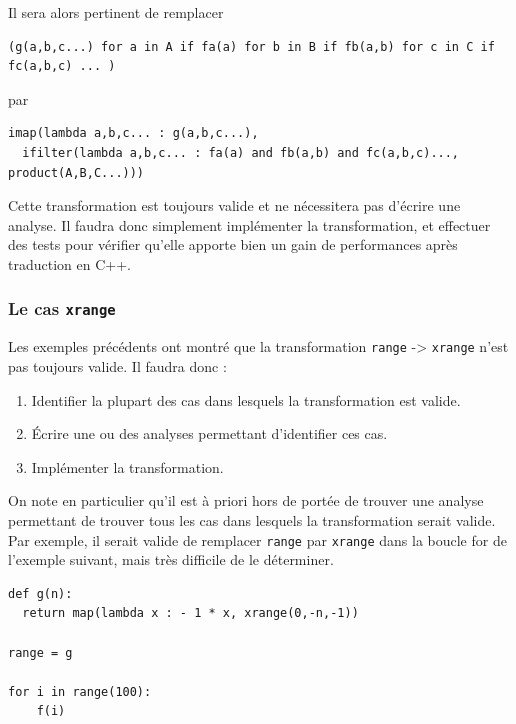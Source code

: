 \documentclass[a4paper]{article}
\begin{document}
Il sera alors pertinent de remplacer

\begin{lstlisting}
(g(a,b,c...) for a in A if fa(a) for b in B if fb(a,b) for c in C if fc(a,b,c) ... )
\end{lstlisting}
 
par

\begin{lstlisting}
imap(lambda a,b,c... : g(a,b,c...), 
  ifilter(lambda a,b,c... : fa(a) and fb(a,b) and fc(a,b,c)..., product(A,B,C...)))
\end{lstlisting}

Cette transformation est toujours valide et ne nécessitera pas
d'écrire une analyse. Il faudra donc simplement implémenter la
transformation, et effectuer des tests pour vérifier qu'elle apporte
bien un gain de performances après traduction en C++.

\subsubsection{Le cas \texttt{xrange}}


Les exemples précédents ont montré que la transformation
\texttt{range} -> \texttt{xrange} n'est pas toujours valide. Il faudra
donc :

\begin{enumerate}
\item Identifier la plupart des cas dans lesquels la transformation
  est valide.
\item Écrire une ou des analyses permettant d'identifier ces cas.
\item Implémenter la transformation.
\end{enumerate}

On note en particulier qu'il est à priori hors de portée de trouver
une analyse permettant de trouver tous les cas dans lesquels la
transformation serait valide. Par exemple, il serait valide de
remplacer \texttt{range} par \texttt{xrange} dans la boucle for de
l'exemple suivant, mais très difficile de le déterminer.


\begin{lstlisting}
def g(n):
  return map(lambda x : - 1 * x, xrange(0,-n,-1))

range = g

for i in range(100):
    f(i)
\end{lstlisting}
\end{document}
